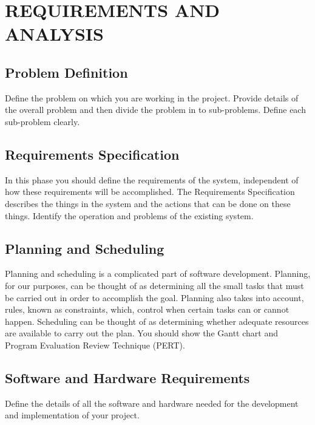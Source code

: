 
\chapter{REQUIREMENTS AND ANALYSIS} %

\label{Chapter4} %



\section{Problem Definition}
Define the problem on which you are working in the project. Provide details of the overall problem and then divide the problem in to sub-problems.
Define each sub-problem clearly.

\section{Requirements Specification}
In this phase you should define the requirements of the system, independent of how these requirements will be accomplished. The Requirements Specification describes the things in the system and the actions that can be done on these things. Identify the operation and problems of the existing system.

\section{Planning and Scheduling}
Planning and scheduling is a complicated part of software development. Planning, for our purposes, can be thought of as determining all the small tasks that must be carried out in order to accomplish the goal. Planning also takes into account, rules, known as constraints, which, control when certain tasks can or cannot happen. Scheduling can be thought of as determining whether adequate resources are available to carry out the plan. You should show the Gantt chart and Program Evaluation Review Technique (PERT).

\section{Software and Hardware Requirements}
Define the details of all the software and hardware needed for the development and implementation of your project.

